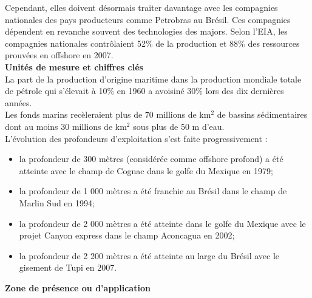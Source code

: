 \documentclass[8pt]{article}
\begin{document}
Cependant, elles doivent désormais traiter davantage avec les compagnies nationales des pays producteurs comme Petrobras au Brésil. Ces compagnies dépendent en revanche souvent des technologies des majors. Selon l'EIA, les compagnies nationales contrôlaient 52\% de la production et 88\% des ressources prouvées en offshore en 2007. \\

\textbf{Unités de mesure et chiffres clés}\\

La part de la production d’origine maritime dans la production mondiale totale de pétrole qui s'élevait à 10\% en 1960 a avoisiné 30\% lors des dix dernières années.\\

Les fonds marins recèleraient plus de 70 millions de km$^2$ de bassins sédimentaires dont au moins 30 millions de km$^2$ sous plus de 50 m d’eau.\\

L’évolution des profondeurs d’exploitation s’est faite progressivement :
\begin{itemize}
	\setlength\itemsep{-0.25em}
	\item la profondeur de 300 mètres (considérée comme offshore profond) a été atteinte avec le champ de Cognac dans le golfe du Mexique en 1979;
	\item la profondeur de 1 000 mètres a été franchie au Brésil dans le champ de Marlin Sud en 1994;
	\item la profondeur de 2 000 mètres a été atteinte dans le golfe du Mexique avec le projet Canyon express dans le champ Aconcagua en 2002;
	\item la profondeur de 2 200 mètres a été atteinte au large du Brésil avec le gisement de Tupi en 2007.
\end{itemize}

\textbf{Zone de présence ou d'application}\\
\end{document}
